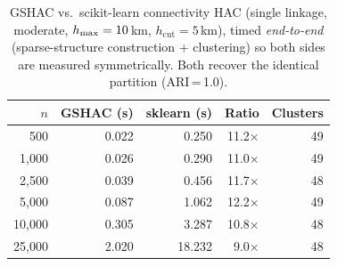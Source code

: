 \begin{table}[t]
\caption{GSHAC vs.\ scikit-learn connectivity HAC (single linkage,
  moderate, \(h_{\max} = 10\)\,km, \(h_{\text{cut}} = 5\)\,km), timed
  \emph{end-to-end} (sparse-structure construction + clustering) so both
  sides are measured symmetrically. Both recover the identical partition
  (ARI\,=\,1.0).}
\label{tab:sklearn}
\small
\begin{tabular}{r r r r r}
\toprule
\(n\) & GSHAC (s) & sklearn (s) & Ratio & Clusters \\
\midrule
500 & 0.022 & 0.250 & 11.2$\times$ & 49 \\
1{,}000 & 0.026 & 0.290 & 11.0$\times$ & 49 \\
2{,}500 & 0.039 & 0.456 & 11.7$\times$ & 48 \\
5{,}000 & 0.087 & 1.062 & 12.2$\times$ & 49 \\
10{,}000 & 0.305 & 3.287 & 10.8$\times$ & 48 \\
25{,}000 & 2.020 & 18.232 & 9.0$\times$ & 48 \\
\bottomrule
\end{tabular}
\end{table}